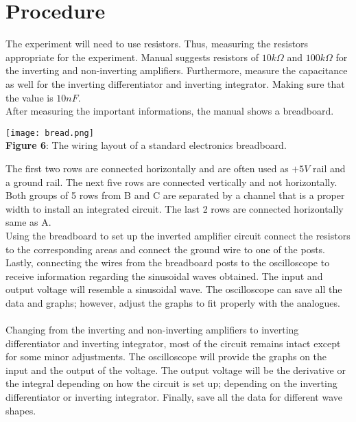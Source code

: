 \documentclass[11pt]{article}
\begin{document}
\section*{Procedure}
The experiment will need to use resistors. Thus, measuring the resistors appropriate for the experiment. Manual suggests resistors of $10k\Omega$ and $100k\Omega$ for the inverting and non-inverting amplifiers. Furthermore, measure the capacitance as well for the inverting differentiator and inverting integrator. Making sure that the value is $10nF$.\\
After measuring the important informations, the manual shows a breadboard.
\begin{center}
    \texttt{[image: bread.png]}\\\textbf{Figure 6}: The wiring layout of a standard electronics breadboard.
\end{center}
The first two rows are connected horizontally and are often used as $+5V$ rail and a ground rail. The next five rows are connected vertically and not horizontally. Both groups of 5 rows from B and C are separated by a channel that is a proper width to install an integrated circuit. The last 2 rows are connected horizontally same as A.\\
Using the breadboard to set up the inverted amplifier circuit connect the resistors to the corresponding areas and connect the ground wire to one of the posts.\\
Lastly, connecting the wires from the breadboard posts to the oscilloscope to receive information regarding the sinusoidal waves obtained. The input and output voltage will resemble a sinusoidal wave. The oscilloscope can save all the data and graphs; however, adjust the graphs to fit properly with the analogues.\\

\\Changing from the inverting and non-inverting amplifiers to inverting differentiator and inverting integrator, most of the circuit remains intact except for some minor adjustments. The oscilloscope will provide the graphs on the input and the output of the voltage. The output voltage will be the derivative or the integral depending on how the circuit is set up; depending on the inverting differentiator or inverting integrator. Finally, save all the data for different wave shapes.
\end{document}
